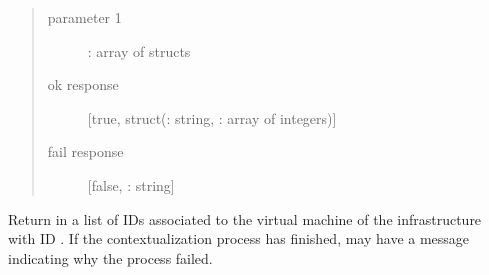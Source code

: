 \documentclass[letterpaper,10pt,english]{sphinxmanual}
\begin{document}
\begin{description}
\begin{quote}
\begin{description}
\item[{parameter 1}] \leavevmode
{}: array of structs

\item[{ok response}] \leavevmode
{[}true, struct(: string, : array of integers){]}

\item[{fail response}] \leavevmode
{[}false, : string{]}

\end{description}\end{quote}

Return in  a list of IDs associated to the virtual machine of the
infrastructure with ID . If the contextualization process has
finished,  may have a message indicating why the process failed.

\end{description}
\end{document}
